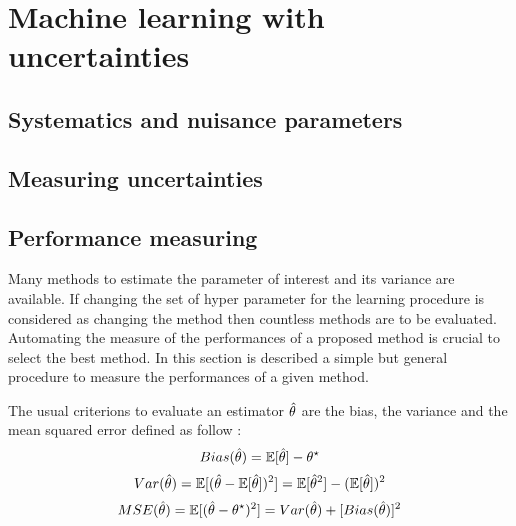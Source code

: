 
\chapter{Machine learning with uncertainties}  %
\label{chap:intro_ml}
\ifpdf
    \graphicspath{{Chapter2/Figs/Raster/}{Chapter2/Figs/PDF/}{Chapter2/Figs/}}
\else
    \graphicspath{{Chapter2/Figs/Vector/}{Chapter2/Figs/}}
\fi

\section{Systematics and nuisance parameters} %
\label{sec:systematics_and_nuisance_parameters}

\section{Measuring uncertainties} %
\label{sec:measuring_uncertainties}

\section{ Performance measuring }
\label{sec:performance_measuring}

Many methods to estimate the parameter of interest and its variance are available.
If changing the set of hyper parameter for the learning procedure is considered as changing the method then countless methods are to be evaluated.
Automating the measure of the performances of a proposed method is crucial to select the best method.
In this section is described a simple but general procedure to measure the performances of a given method.

The usual criterions to evaluate an estimator $\hat\theta$ are the bias, the variance and the mean squared error defined as follow :
\begin{equation}
	Bias(\hat\theta) = \mathbb{E}[\hat\theta] - \theta^\star
\end{equation}
\begin{equation}
	Var(\hat\theta) = \mathbb{E}[ (\hat\theta - \mathbb{E}[\hat\theta])^2 ] = \mathbb{E}[\hat\theta^2] - (\mathbb{E}[\hat\theta])^2
\end{equation}
\begin{equation}
	MSE(\hat\theta) = \mathbb{E}[(\hat\theta - \theta^\star)^2] = Var(\hat\theta) + [Bias(\hat\theta)]^2
\end{equation}

